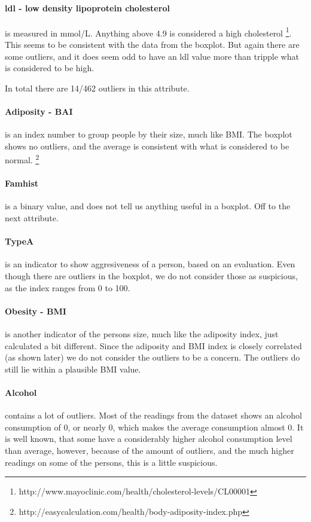\paragraph{ldl - low density lipoprotein cholesterol} is measured in mmol/L. Anything above 4.9 is considered a high cholesterol \footnote{http://www.mayoclinic.com/health/cholesterol-levels/CL00001}. This seems to be consistent with the data from the boxplot. But again there are some outliers, and it does seem odd to have an ldl value more than tripple what is considered to be high.

In total there are 14/462 outliers in this attribute.

\paragraph{Adiposity - BAI} is an index number to group people by their size, much like BMI. The boxplot shows no outliers, and the average is consistent with what is considered to be normal. \footnote{http://easycalculation.com/health/body-adiposity-index.php}

\paragraph{Famhist} is a binary value, and does not tell us anything useful in a boxplot. Off to the next attribute.

\paragraph{TypeA} is an indicator to show aggresiveness of a person, based on an evaluation. Even though there are outliers in the boxplot, we do not consider those as suspicious, as the index ranges from 0 to 100.

\paragraph{Obesity - BMI} is another indicator of the persons size, much like the adiposity index, just calculated a bit different. Since the adiposity and BMI index is closely correlated (as shown later) we do not consider the outliers to be a concern. The outliers do still lie within a plausible BMI value.

\paragraph{Alcohol} contains a lot of outliers. Most of the readings from the dataset shows an alcohol consumption of 0, or nearly 0, which makes the average consumption almost 0. It is well known, that some have a considerably higher alcohol consumption level than average, however, because of the amount of outliers, and the much higher readings on some of the persons, this is a little suspicious.

